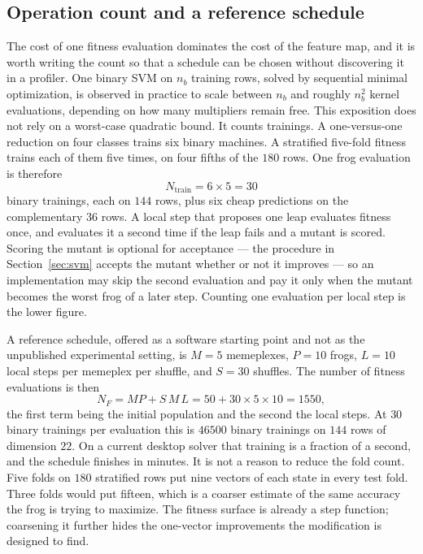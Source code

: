 \subsection{Operation count and a reference schedule}
\label{sec:cost}

The cost of one fitness evaluation dominates the cost of the feature map, and it is worth writing the count so that a schedule can be chosen without discovering it in a profiler.
One binary SVM on \(n_{b}\) training rows, solved by sequential minimal optimization, is observed in practice to scale between \(n_{b}\) and roughly \(n_{b}^{2}\) kernel evaluations, depending on how many multipliers remain free.
This exposition does not rely on a worst-case quadratic bound.
It counts trainings.
A one-versus-one reduction on four classes trains six binary machines.
A stratified five-fold fitness trains each of them five times, on four fifths of the \(180\) rows.
One frog evaluation is therefore
\begin{equation}
N_{\mathrm{train}}=6\times 5=30
\label{eq:ntrain}
\end{equation}
binary trainings, each on \(144\) rows, plus six cheap predictions on the complementary \(36\) rows.
A local step that proposes one leap evaluates fitness once, and evaluates it a second time if the leap fails and a mutant is scored.
Scoring the mutant is optional for acceptance --- the procedure in Section~\ref{sec:svm} accepts the mutant whether or not it improves --- so an implementation may skip the second evaluation and pay it only when the mutant becomes the worst frog of a later step.
Counting one evaluation per local step is the lower figure.

A reference schedule, offered as a software starting point and not as the unpublished experimental setting, is \(M=5\) memeplexes, \(P=10\) frogs, \(L=10\) local steps per memeplex per shuffle, and \(S=30\) shuffles.
The number of fitness evaluations is then
\begin{equation}
N_{F}
=MP+S\,M\,L
=50+30\times 5\times 10
=1550,
\label{eq:nfeval}
\end{equation}
the first term being the initial population and the second the local steps.
At \(30\) binary trainings per evaluation this is \(46500\) binary trainings on \(144\) rows of dimension \(22\).
On a current desktop solver that training is a fraction of a second, and the schedule finishes in minutes.
It is not a reason to reduce the fold count.
Five folds on \(180\) stratified rows put nine vectors of each state in every test fold.
Three folds would put fifteen, which is a coarser estimate of the same accuracy the frog is trying to maximize.
The fitness surface is already a step function; coarsening it further hides the one-vector improvements the modification is designed to find.

